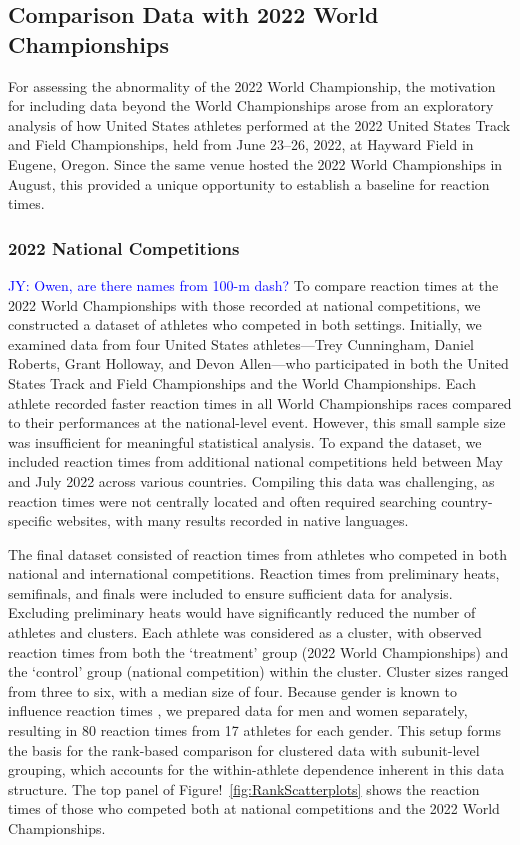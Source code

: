 \documentclass[12pt, letterpaper]{article}
\newcommand{\jy}[1]{\textcolor{blue}{JY: #1}}
\begin{document}
\subsection{Comparison Data with 2022 World Championships}
\label{sec:databeyond}

For assessing the abnormality of the 2022 World Championship, 
the motivation for including data beyond the World Championships arose from 
an exploratory analysis of how United States athletes performed at the 2022 
United States Track and Field Championships, held from June 23--26, 2022, at 
Hayward Field in Eugene, Oregon. Since the same venue hosted the 2022 World 
Championships in August, this provided a unique opportunity to establish a 
baseline for reaction times. 


\subsubsection{2022 National Competitions}
\label{sec:datanational}


\jy{Owen, are there names from 100-m dash?}
To compare reaction times at the 2022 World Championships with those
recorded at national competitions, we constructed a dataset of athletes 
who competed in both settings. Initially, we examined data from four
United States athletes---Trey Cunningham, Daniel Roberts, Grant
Holloway, and Devon Allen---who participated in both the United States 
Track and Field Championships and the World Championships. Each athlete 
recorded faster reaction times in all World Championships races compared 
to their performances at the national-level event. However, this small 
sample size was insufficient for meaningful statistical analysis. To 
expand the dataset, we included reaction times from additional national 
competitions held between May and July 2022 across various countries. 
Compiling this data was challenging, as reaction times were not centrally 
located and often required searching country-specific websites, with many 
results recorded in native languages.


The final dataset consisted of reaction times from athletes who competed 
in both national and international competitions. Reaction times from 
preliminary heats, semifinals, and finals were included to ensure 
sufficient data for analysis. Excluding preliminary heats would have 
significantly reduced the number of athletes and clusters. Each
athlete was considered as a cluster, with observed reaction times
from both the `treatment' group (2022 World Championships) and
the `control' group (national competition) within the cluster. Cluster 
sizes ranged from three to six, with a median size of four. Because gender 
is known to influence reaction times \citep{babicc2009reaction,
  lipps2011implications}, we prepared data for men and women
separately, resulting in 80 reaction times from 17 athletes for each
gender. This setup forms the basis for the rank-based comparison for
clustered data with subunit-level grouping, which accounts for the
within-athlete dependence inherent in this data structure. The top
panel of Figure!~\ref{fig:RankScatterplots} shows the reaction times
of those who competed both at national competitions and the 2022 World
Championships. 
\end{document}

